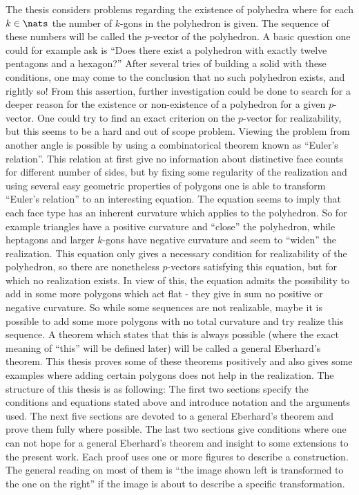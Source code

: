 The thesis considers problems regarding the existence of polyhedra where for each $k \in \nats$ the number of $k$-gons in the polyhedron is given. The sequence of these numbers will be called the $p$-vector of the polyhedron. A basic question one could for example ask is ``Does there exist a polyhedron with exactly twelve pentagons and a hexagon?'' After several tries of building a solid with these conditions, one may come to the conclusion that no such polyhedron exists, and rightly so! From this assertion, further investigation could be done to search for a deeper reason for the existence or non-existence of a polyhedron for a given $p$-vector. One could try to find an exact criterion on the $p$-vector for realizability, but this seems to be a hard and out of scope problem. Viewing the problem from another angle is possible by using a combinatorical theorem known as ``Euler's relation''. This relation at first give no information about distinctive face counts for different number of sides, but by fixing some regularity of the realization and using several easy geometric properties of polygons one is able to transform ``Euler's relation'' to an interesting equation. The equation seems to imply that each face type has an inherent curvature which applies to the polyhedron. So for example triangles have a positive curvature and ``close'' the polyhedron, while heptagons and larger $k$-gons have negative curvature and seem to ``widen'' the realization. This equation only gives a necessary condition for realizability of the polyhedron, so there are nonetheless $p$-vectors satisfying this equation, but for which no realization exists. In view of this, the equation admits the possibility to add in some more polygons which act flat - they give in sum no positive or negative curvature. So while some sequences are not realizable, maybe it is possible to add some more polygons with no total curvature and try realize this sequence. A theorem which states that this is always possible (where the exact meaning of ``this'' will be defined later) will be called a general Eberhard's theorem. This thesis proves some of these theorems positively and also gives some examples where adding certain polygons does not help in the realization. The structure of this thesis is as following: The first two sections specify the conditions and equations stated above and introduce notation and the arguments used. The next five sections are devoted to a general Eberhard's theorem and prove them fully where possible. The last two sections give conditions where one can not hope for a general Eberhard's theorem and insight to some extensions to the present work. Each proof uses one or more figures to describe a construction. The general reading on most of them is ``the image shown left is transformed to the one on the right'' if the image is about to describe a specific transformation.
